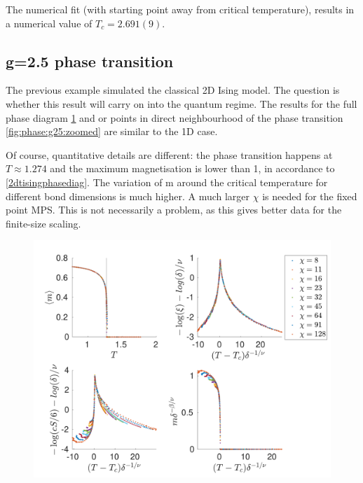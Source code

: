 The numerical fit (with starting point away from  critical temperature), results in a numerical value of $T_c = 2.691(9) $.

\subsection{g=2.5 phase transition}

The previous example simulated the classical 2D Ising model. The question is whether this result will carry on into the quantum regime. The results for the full phase diagram \cref{fig:phase:g25:full} and or points in direct neighbourhood of the phase transition \cref{fig:phase:g25:zoomed} are similar to the 1D case.

Of course, quantitative details are different: the phase transition happens at $T\approx 1.274$ and the maximum magnetisation is lower than 1, in accordance to \cref{2dtisingphasediag}. The variation of m around the critical temperature for different bond dimensions is much higher. A much larger $\chi$ is needed for the fixed point MPS. This is not necessarily a problem, as this gives better data for the finite-size scaling.

\begin{figure}[H]
    \center
    \includegraphics[width=\textwidth]{Figuren/phasediag/g25/Full.pdf}
    \caption{  }
    \label{fig:phase:g25:full}
\end{figure}

